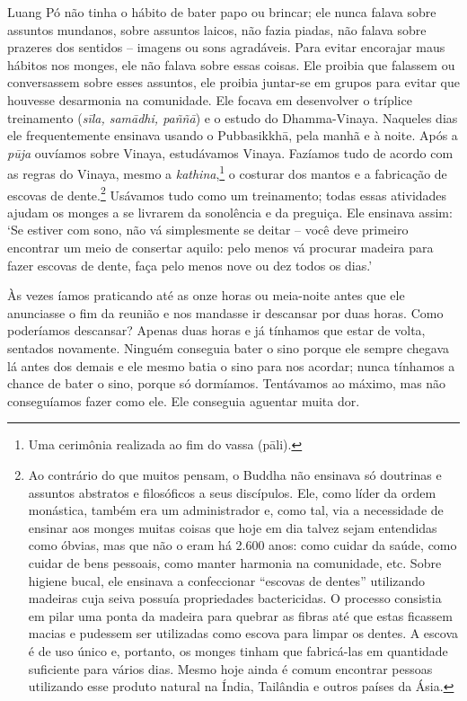 Luang Pó não tinha o hábito de bater papo ou brincar; ele nunca falava
sobre assuntos mundanos, sobre assuntos laicos, não fazia piadas, não
falava sobre prazeres dos sentidos -- imagens ou sons agradáveis. Para
evitar encorajar maus hábitos nos monges, ele não falava sobre essas
coisas. Ele proibia que falassem ou conversassem sobre esses assuntos,
ele proibia juntar-se em grupos para evitar que houvesse desarmonia na
comunidade. Ele focava em desenvolver o tríplice treinamento
(\emph{sīla, samādhi, paññā}) e o estudo do Dhamma-Vinaya. Naqueles dias
ele frequentemente ensinava usando o Pubbasikkhā, pela manhã e à noite.
Após a \emph{pūja} ouvíamos sobre Vinaya, estudávamos Vinaya. Fazíamos
tudo de acordo com as regras do Vinaya, mesmo a \emph{kathina},\footnote{Uma
  cerimônia realizada ao fim do vassa (pāli).} o costurar dos
mantos e a fabricação de escovas de dente.\footnote{Ao contrário do que
  muitos pensam, o Buddha não ensinava só doutrinas e assuntos abstratos
  e filosóficos a seus discípulos. Ele, como líder da ordem monástica,
  também era um administrador e, como tal, via a necessidade de ensinar
  aos monges muitas coisas que hoje em dia talvez sejam entendidas como
  óbvias, mas que não o eram há 2.600 anos: como cuidar da saúde, como
  cuidar de bens pessoais, como manter harmonia na comunidade, etc.
  Sobre higiene bucal, ele ensinava a confeccionar ``escovas de dentes''
  utilizando madeiras cuja seiva possuía propriedades bactericidas. O
  processo consistia em pilar uma ponta da madeira para quebrar as
  fibras até que estas ficassem macias e pudessem ser utilizadas como
  escova para limpar os dentes. A escova é de uso único e, portanto, os
  monges tinham que fabricá-las em quantidade suficiente para vários
  dias. Mesmo hoje ainda é comum encontrar pessoas utilizando esse
  produto natural na Índia, Tailândia e outros países da Ásia.}
Usávamos tudo como um treinamento; todas essas atividades ajudam os
monges a se livrarem da sonolência e da preguiça. Ele ensinava assim:
`Se estiver com sono, não vá simplesmente se deitar -- você deve
primeiro encontrar um meio de consertar aquilo: pelo menos vá procurar
madeira para fazer escovas de dente, faça pelo menos nove ou dez todos
os dias.'

Às vezes íamos praticando até as onze horas ou meia-noite antes que ele
anunciasse o fim da reunião e nos mandasse ir descansar por duas horas.
Como poderíamos descansar? Apenas duas horas e já tínhamos que estar de
volta, sentados novamente. Ninguém \mbox{conseguia} bater o sino porque ele
sempre chegava lá antes dos demais e ele mesmo batia o sino para nos
acordar; nunca tínhamos a chance de bater o sino, porque só dormíamos.
Tentávamos ao máximo, mas não conseguíamos fazer como ele. Ele conseguia
aguentar muita dor.

